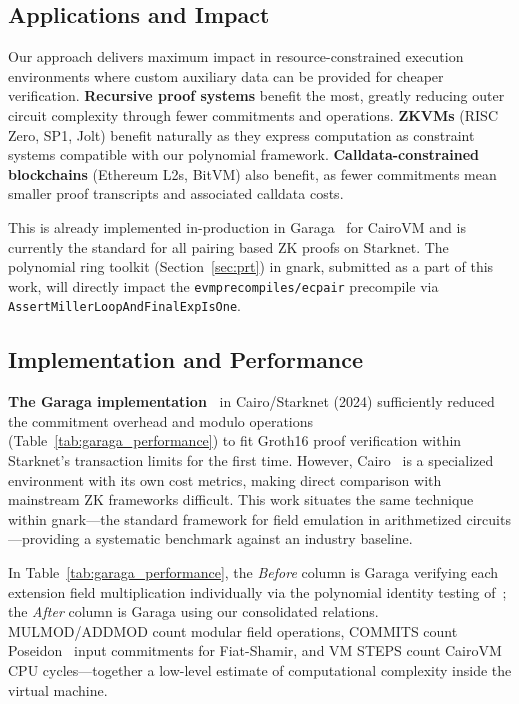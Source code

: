 \subsection{Applications and Impact}

Our approach delivers maximum impact in resource-constrained execution environments where custom auxiliary data can be provided for cheaper verification. \textbf{Recursive proof systems} benefit the most, greatly reducing outer circuit complexity through fewer commitments and operations. \textbf{ZKVMs} (RISC Zero, SP1, Jolt) benefit naturally as they express computation as constraint systems compatible with our polynomial framework. \textbf{Calldata-constrained blockchains} (Ethereum L2s, BitVM) also benefit, as fewer commitments mean smaller proof transcripts and associated calldata costs.

This is already implemented in-production in Garaga~\cite{grg} for CairoVM and is currently the standard for all pairing based ZK proofs on Starknet. The polynomial ring toolkit (Section~\ref{sec:prt}) in gnark, submitted as a part of this work, will directly impact the \texttt{evmprecompiles/ecpair} precompile via \texttt{AssertMillerLoopAndFinalExpIsOne}.

\subsection{Implementation and Performance}

\textbf{The Garaga implementation~\cite{grg}}
in Cairo/Starknet (2024) sufficiently reduced the commitment overhead and modulo operations (Table~\ref{tab:garaga_performance}) to fit Groth16
proof verification within Starknet's transaction limits for the first time.
However, Cairo~\cite{cairo} is a specialized environment with its own cost metrics,
making direct comparison with mainstream ZK frameworks difficult.
This work situates the same technique within gnark---the standard framework for
field emulation in arithmetized circuits---providing a systematic benchmark against
an industry baseline.

In Table~\ref{tab:garaga_performance}, the \emph{Before} column is Garaga verifying each extension field multiplication individually via the polynomial identity testing of~\cite{FXFM23}; the \emph{After} column is Garaga using our consolidated relations. MULMOD/ADDMOD count modular field operations, COMMITS count Poseidon~\cite{poseidon} input commitments for Fiat-Shamir, and VM STEPS count CairoVM CPU cycles---together a low-level estimate of computational complexity inside the virtual machine.

